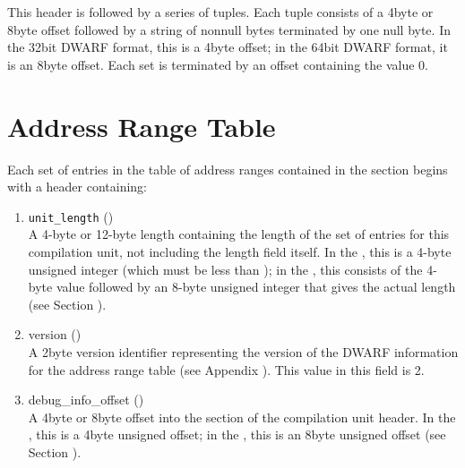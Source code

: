 This header is followed by a series of tuples. Each tuple
consists of a 4\dash byte or 8\dash byte offset followed by a string
of non\dash null bytes terminated by one null byte. 
In the 32\dash bit
DWARF format, this is a 4\dash byte offset; in the 64\dash bit DWARF
format, it is an 8\dash byte offset. 
Each set is terminated by an
offset containing the value 0.


\section{Address Range Table}
\label{datarep:addrssrangetable}

Each set of entries in the table of address ranges contained
in the \dotdebugaranges{}
section begins with a header containing:
\begin{enumerate}[1. ]

\item \texttt{unit\_length} () \\
A 4-byte or 12-byte length containing the length of the
set of entries for this compilation unit, not including the
length field itself. In the \thirtytwobitdwarfformat, this is a
4-byte unsigned integer (which must be less than \xfffffffzero);
in the \sixtyfourbitdwarfformat, this consists of the 4-byte value
\wffffffff followed by an 8-byte unsigned integer that gives
the actual length 
(see Section ).

\item version () \\
A 2\dash byte version identifier representing the version of the
DWARF information for the address range table
(see Appendix ).
This value in this field  is 2. 
 

\item debug\_info\_offset () \\
A 
4\dash byte or 8\dash byte offset into the 
\dotdebuginfo{} section of
the compilation unit header. In the \thirtytwobitdwarfformat,
this is a 4\dash byte unsigned offset; in the \sixtyfourbitdwarfformat,
this is an 8\dash byte unsigned offset 
(see Section ).


\end{enumerate}
